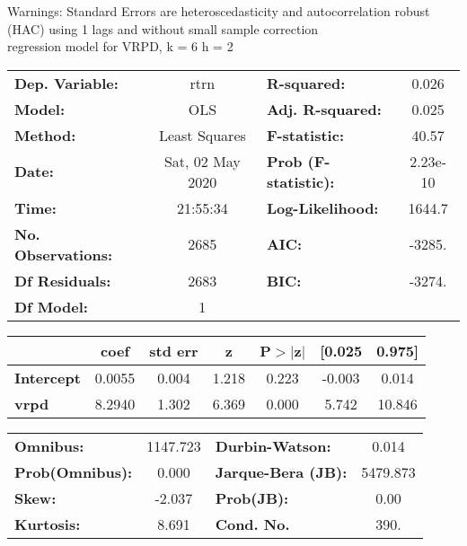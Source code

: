 Warnings: \newline
 [1] Standard Errors are heteroscedasticity and autocorrelation robust (HAC) using 1 lags and without small sample correction\\ 

regression model for VRPD, k = 6 h = 2\begin{center}
\begin{tabular}{lclc}
\toprule
\textbf{Dep. Variable:}    &       rtrn       & \textbf{  R-squared:         } &     0.026   \\
\textbf{Model:}            &       OLS        & \textbf{  Adj. R-squared:    } &     0.025   \\
\textbf{Method:}           &  Least Squares   & \textbf{  F-statistic:       } &     40.57   \\
\textbf{Date:}             & Sat, 02 May 2020 & \textbf{  Prob (F-statistic):} &  2.23e-10   \\
\textbf{Time:}             &     21:55:34     & \textbf{  Log-Likelihood:    } &    1644.7   \\
\textbf{No. Observations:} &        2685      & \textbf{  AIC:               } &    -3285.   \\
\textbf{Df Residuals:}     &        2683      & \textbf{  BIC:               } &    -3274.   \\
\textbf{Df Model:}         &           1      & \textbf{                     } &             \\
\bottomrule
\end{tabular}
\begin{tabular}{lcccccc}
                   & \textbf{coef} & \textbf{std err} & \textbf{z} & \textbf{P$> |$z$|$} & \textbf{[0.025} & \textbf{0.975]}  \\
\midrule
\textbf{Intercept} &       0.0055  &        0.004     &     1.218  &         0.223        &       -0.003    &        0.014     \\
\textbf{vrpd}      &       8.2940  &        1.302     &     6.369  &         0.000        &        5.742    &       10.846     \\
\bottomrule
\end{tabular}
\begin{tabular}{lclc}
\textbf{Omnibus:}       & 1147.723 & \textbf{  Durbin-Watson:     } &    0.014  \\
\textbf{Prob(Omnibus):} &   0.000  & \textbf{  Jarque-Bera (JB):  } & 5479.873  \\
\textbf{Skew:}          &  -2.037  & \textbf{  Prob(JB):          } &     0.00  \\
\textbf{Kurtosis:}      &   8.691  & \textbf{  Cond. No.          } &     390.  \\
\bottomrule
\end{tabular}
\end{center}

